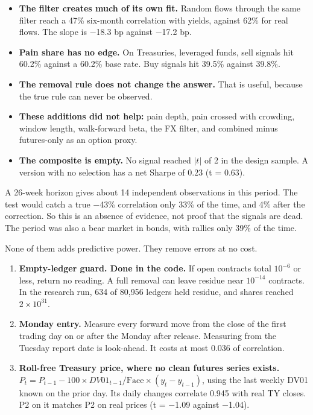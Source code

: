 \documentclass[11pt,a4paper]{article}
\newcommand{\sublabel}[1]{\par\vspace{3pt}\needspace{3\baselineskip}{\sffamily\small\bfseries #1}\par\nopagebreak[4]\vspace{1pt}}
\begin{document}
\sublabel{What failed}
\begin{itemize}
\item \textbf{The filter creates much of its own fit.} Random flows through the same filter reach a 47\% six-month correlation with yields, against 62\% for real flows. The slope is $-$18.3 bp against $-$17.2 bp.
\item \textbf{Pain share has no edge.} On Treasuries, leveraged funds, sell signals hit 60.2\% against a 60.2\% base rate. Buy signals hit 39.5\% against 39.8\%.
\item \textbf{The removal rule does not change the answer.} That is useful, because the true rule can never be observed.
\item \textbf{These additions did not help:} pain depth, pain crossed with crowding, window length, walk-forward beta, the FX filter, and combined minus futures-only as an option proxy.
\item \textbf{The composite is empty.} No signal reached $|t|$ of 2 in the design sample. A version with no selection has a net Sharpe of 0.23 (t = 0.63).
\end{itemize}

\begin{warnbox}
A 26-week horizon gives about 14 independent observations in this period. The test would catch a true $-$43\% correlation only 33\% of the time, and 4\% after the correction. So this is an absence of evidence, not proof that the signals are dead. The period was also a bear market in bonds, with rallies only 39\% of the time.
\end{warnbox}

\sublabel{Adopt these three changes}
None of them adds predictive power. They remove errors at no cost.
\begin{enumerate}
\item \textbf{Empty-ledger guard. Done in the code.} If open contracts total $10^{-6}$ or less, return no reading. A full removal can leave residue near $10^{-14}$ contracts. In the research run, 634 of 80,956 ledgers held residue, and shares reached $2\times10^{31}$.
\item \textbf{Monday entry.} Measure every forward move from the close of the first trading day on or after the Monday after release. Measuring from the Tuesday report date is look-ahead. It costs at most 0.036 of correlation.
\item \textbf{Roll-free Treasury price, where no clean futures series exists.} $P_t = P_{t-1} - 100 \times DV01_{t-1} / \text{Face} \times (y_t - y_{t-1})$, using the last weekly DV01 known on the prior day. Its daily changes correlate 0.945 with real TY closes. P2 on it matches P2 on real prices (t = $-$1.09 against $-$1.04).
\end{enumerate}
\end{document}
